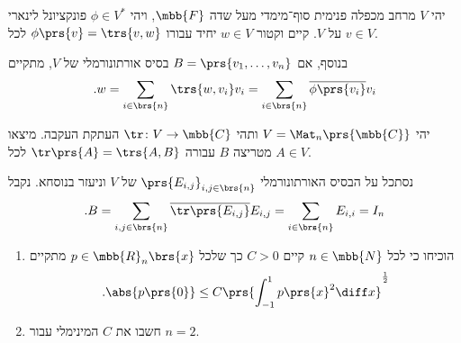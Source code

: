 \documentclass[a4paper,10pt,twoside,openany]{book}
\begin{document}
\begin{theorem}
יהי
$V$
מרחב מכפלה פנימית סוף־מימדי מעל שדה
$\mbb{F}$,
ויהי
$\phi \in V^*$
פונקציונל לינארי על
$V$.
קיים וקטור
$w \in V$
יחיד עבורו
$\phi\prs{v} = \trs{v,w}$
לכל
$v \in V$.

בנוסף, אם
$B = \prs{v_1, \ldots, v_n}$
בסיס אורתונורמלי של
$V$,
מתקיים
\[\text{.} w = \sum_{i \in \brs{n}} \trs{w, v_i} v_i = \sum_{i \in \brs{n}} \overline{\phi\prs{v_i}} v_i\]
\end{theorem}

\begin{exercisechap}
יהי
$V = \Mat_n\prs{\mbb{C}}$
ותהי
$\tr \colon V \to \mbb{C}$
העתקת העקבה.
מיצאו מטריצה
$B$
עבורה
$\tr\prs{A} = \trs{A,B}$
לכל
$A \in V$.
\end{exercisechap}

\begin{solution}
נסתכל על הבסיס האורתונורמלי
$\prs{E_{i,j}}_{i,j \in \brs{n}}$
של
$V$
וניעזר בנוסחא. נקבל
\[\text{.} B = \sum_{i,j \in \brs{n}} \overline{\tr\prs{E_{i,j}}} E_{i,j} = \sum_{i \in \brs{n}} E_{i,i} = I_n\]
\end{solution}

\begin{exercisechap}
\begin{enumerate}
\item הוכיחו כי לכל
$n \in \mbb{N}$
קיים
$C > 0$
כך שלכל
$p \in \mbb{R}_n\brs{x}$
מתקיים
\[\text{.} \abs{p\prs{0}} \leq C \prs{\int_{-1}^1 p\prs{x}^2 \diff x}^{\frac{1}{2}}\]

\item חשבו את
$C$
המינימלי עבור
$n=2$.
\end{enumerate}
\end{exercisechap}
\end{document}
